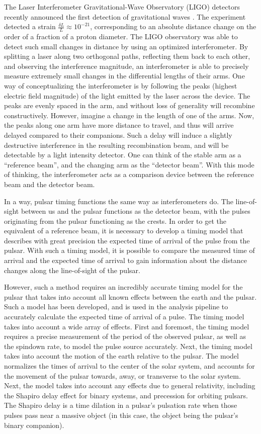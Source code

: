 \documentclass[12pt]{article}
\begin{document}
The Laser Interferometer Gravitational-Wave Observatory (LIGO) detectors recently announced the first detection of gravitational
waves \cite{LIGO}. The experiment detected a strain $\frac{\delta L}{L} \approx 10^{-21}$, corresponding to an absolute
distance change on the order of a fraction of a proton diameter. The LIGO
observatory was able to detect such small changes in distance by using an
optimized interferometer. By splitting a laser along two orthogonal paths,
reflecting them back to each other, and observing the interference magnitude, an
interferometer is able to precisely measure extremely small changes in the
differential lengths of their arms. One way of conceptualizing the
interferometer is by following the peaks (highest electric field magnitude) of
the light emitted by the laser across the device. The peaks are evenly spaced
in the arm, and without loss of generality will recombine constructively.
However, imagine a change in the length of one of the arms. Now, the peaks
along one arm have more distance to travel, and thus will arrive delayed
compared to their companions. Such a delay will induce a slightly destructive
interference in the resulting recombination beam, and will be detectable by a
light intensity detector. One can think of the stable arm as a ``reference
beam'', and the changing arm as the ``detector beam''. With this mode of
thinking, the interferometer acts as a comparison device between the reference
beam and the detector beam.

In a way, pulsar timing functions the same way as interferometers do. The
line-of-sight between us and the pulsar functions as the detector beam, with the
pulses originating from the pulsar functioning as the crests. In order to get
the equivalent of a reference beam, it is necessary to develop a timing model
that describes with great precision the expected time of arrival of the pulse
from the pulsar. With such a timing model, it is possible to compare the
measured time of arrival and the expected time of arrival to gain information
about the distance changes along the line-of-sight of the pulsar.

However, such a method requires an incredibly accurate timing model for the
pulsar that takes into account all known effects between the earth and the
pulsar. Such a model has been developed, and is used in the analysis pipeline to
accurately calculate the expected time of arrival of a pulse. The timing model
takes into account a wide array of effects. First and foremost, the timing model
requires a precise measurement of the period of the observed pulsar, as well as
the spindown rate, to model the pulse source accurately. Next, the timing model
takes into account the motion of the earth relative to the pulsar. The model
normalizes the times of arrival to the center of the solar system, and accounts
for the movement of the pulsar towards, away, or transverse to the solar system.
Next, the model takes into account any effects due to general relativity,
including the Shapiro delay effect for binary systems, and precession for
orbiting pulsars. The Shapiro delay is a time dilation in a pulsar's pulsation
rate when those pulses pass near a massive object (in this case, the object
being the pulsar's binary companion).
\end{document}
